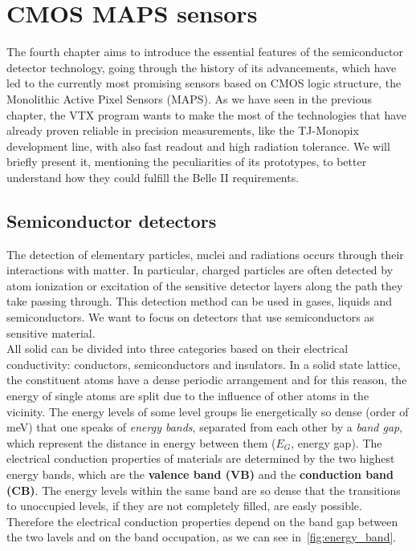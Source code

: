 \chapter{CMOS MAPS sensors} \label{ch:CMOS}

The fourth chapter aims to introduce the essential features of the semiconductor detector technology, going through the history of its advancements, which have led to the currently most promising sensors based on CMOS logic structure, the Monolithic Active Pixel Sensors (MAPS). As we have seen in the previous chapter, the VTX program wants to make the most of the technologies that have already proven reliable in precision measurements, like the TJ-Monopix development line, with also fast readout and high radiation tolerance. We will briefly present it, mentioning the peculiarities of its prototypes, to better understand how they could fulfill the Belle II requirements.


\section{Semiconductor detectors} 

The detection of elementary particles, nuclei and radiations occurs through their interactions with matter. In particular, charged particles are often detected by atom ionization or excitation of the sensitive detector layers along the path they take passing through. This detection method can be used in gases, liquids and semiconductors. We want to focus on detectors that use semiconductors as sensitive material. \\

All solid can be divided into three categories based on their electrical conductivity: conductors, semiconductors and insulators. 
In a solid state lattice, the constituent atoms have a dense periodic arrangement and for this reason, the energy of single atoms are split due to the influence of other atoms in the vicinity. The energy levels of some level groups lie energetically so dense (order of meV) that one speaks of \emph{energy bands}, separated from each other by a \emph{band gap}, which represent the distance in energy between them (\textbf{$E_{G}$}, energy gap). The electrical conduction properties of materials are determined by the two highest energy bands, which are the \textbf{valence band (VB)} and the \textbf{conduction band (CB)}. The energy levels within the same band are so dense that the transitions to unoccupied levels, if they are not completely filled, are easly possible. Therefore the electrical conduction properties depend on the band gap between the two lavels and on the band occupation, as we can see in~\autoref{fig:energy_band}.

